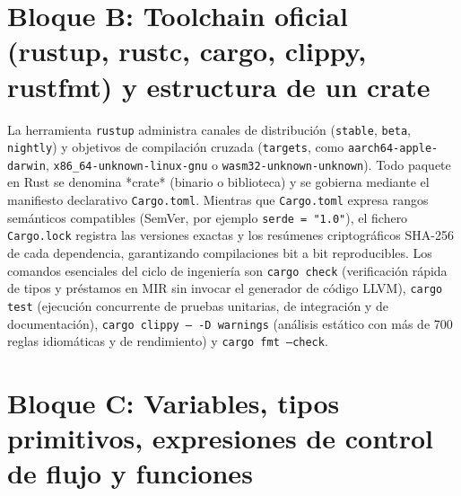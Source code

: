 \documentclass{book}
\begin{document}
\section{Bloque B: Toolchain oficial (rustup, rustc, cargo, clippy, rustfmt) y estructura de un crate}

La herramienta \texttt{rustup} administra canales de distribución (\texttt{stable}, \texttt{beta}, \texttt{nightly}) y objetivos de compilación cruzada (\texttt{targets}, como \texttt{aarch64-apple-darwin}, \texttt{x86\_64-unknown-linux-gnu} o \texttt{wasm32-unknown-unknown}). Todo paquete en Rust se denomina *crate* (binario o biblioteca) y se gobierna mediante el manifiesto declarativo \texttt{Cargo.toml}. Mientras que \texttt{Cargo.toml} expresa rangos semánticos compatibles (SemVer, por ejemplo \texttt{serde = "1.0"}), el fichero \texttt{Cargo.lock} registra las versiones exactas y los resúmenes criptográficos SHA-256 de cada dependencia, garantizando compilaciones bit a bit reproducibles. Los comandos esenciales del ciclo de ingeniería son \texttt{cargo check} (verificación rápida de tipos y préstamos en MIR sin invocar el generador de código LLVM), \texttt{cargo test} (ejecución concurrente de pruebas unitarias, de integración y de documentación), \texttt{cargo clippy -- -D warnings} (análisis estático con más de 700 reglas idiomáticas y de rendimiento) y \texttt{cargo fmt --check}.

\section{Bloque C: Variables, tipos primitivos, expresiones de control de flujo y funciones}
\end{document}
